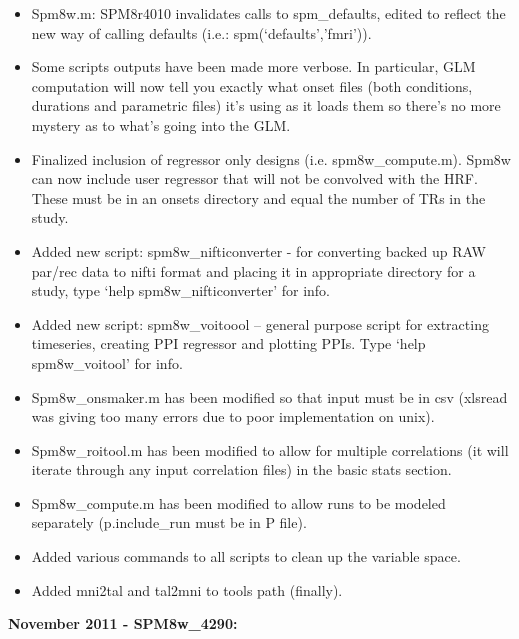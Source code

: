 \documentclass[12pt]{article}
\begin{document}
\begin{itemize}
	\item Spm8w.m: SPM8r4010 invalidates calls to spm\_defaults, edited to reflect the new way of calling defaults (i.e.: spm(‘defaults’,’fmri’)).
	\item Some scripts outputs have been made more verbose. In particular, GLM computation will now tell you exactly what onset files (both conditions, durations and parametric files) it’s using as it loads them so there’s no more mystery as to what’s going into the GLM. 
	\item Finalized inclusion of regressor only designs (i.e. spm8w\_compute.m). Spm8w can now include user regressor that will not be convolved with the HRF. These must be in an onsets directory and equal the number of TRs in the study. 
	\item Added new script: spm8w\_nifticonverter - for converting backed up RAW par/rec data to nifti format and placing it in appropriate directory for a study, type \newline ‘help spm8w\_nifticonverter’ for info.
	\item Added new script: spm8w\_voitoool – general purpose script for extracting timeseries, creating PPI regressor and plotting PPIs. Type ‘help spm8w\_voitool’ for info.
	\item Spm8w\_onsmaker.m has been modified so that input must be in csv (xlsread was giving too many errors due to poor implementation on unix). 
	\item Spm8w\_roitool.m has been modified to allow for multiple correlations (it will iterate \newline through any input correlation files) in the basic stats section.
	\item Spm8w\_compute.m has been modified to allow runs to be modeled separately \newline (p.include\_run must be in P file). 
	\item Added various commands to all scripts to clean up the variable space. 
	\item Added mni2tal and tal2mni to tools path (finally).
\end{itemize}
\noindent
\textbf{November 2011 - SPM8w\_4290:}
\end{document}
